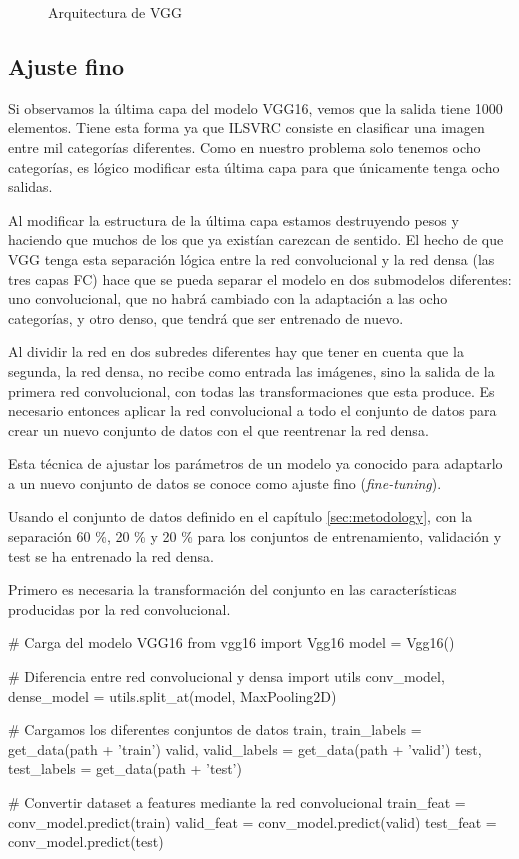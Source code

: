 \begin{figure}
  \caption{Arquitectura de VGG}
\label{vgg16-arch}
\end{figure}

\subsection{Ajuste fino}

Si observamos la última capa del modelo VGG16, vemos que la salida tiene 1000 elementos. Tiene esta forma ya que ILSVRC consiste en clasificar una imagen entre mil categorías diferentes. Como en nuestro problema solo tenemos ocho categorías, es lógico modificar esta última capa para que únicamente tenga ocho salidas.

Al modificar la estructura de la última capa estamos destruyendo pesos y haciendo que muchos de los que ya existían carezcan de sentido. El hecho de que VGG tenga esta separación lógica entre la red convolucional y la red densa (las tres capas FC) hace que se pueda separar el modelo en dos submodelos diferentes: uno convolucional, que no habrá cambiado con la adaptación a las ocho categorías, y otro denso, que tendrá que ser entrenado de nuevo.

Al dividir la red en dos subredes diferentes hay que tener en cuenta que la segunda, la red densa, no recibe como entrada las imágenes, sino la salida de la primera red convolucional, con todas las transformaciones que esta produce. Es necesario entonces aplicar la red convolucional a todo el conjunto de datos para crear un nuevo conjunto de datos con el que reentrenar la red densa.

Esta técnica de ajustar los parámetros de un modelo ya conocido para adaptarlo a un nuevo conjunto de datos se conoce como ajuste fino (\textit{fine-tuning}).

Usando el conjunto de datos definido en el capítulo \ref{sec:metodology}, con la separación 60 \%, 20 \% y 20 \% para los conjuntos de entrenamiento, validación y test se ha entrenado la red densa.

Primero es necesaria la transformación del conjunto en las características producidas por la red convolucional.

\begin{python}
# Carga del modelo VGG16
from vgg16 import Vgg16
model = Vgg16()

# Diferencia entre red convolucional y densa
import utils
conv_model, dense_model = utils.split_at(model, MaxPooling2D)

# Cargamos los diferentes conjuntos de datos
train, train_labels = get_data(path + 'train')
valid, valid_labels = get_data(path + 'valid')
test, test_labels = get_data(path + 'test')

# Convertir dataset a features mediante la red convolucional
train_feat = conv_model.predict(train)
valid_feat = conv_model.predict(valid)
test_feat = conv_model.predict(test)
\end{python}

